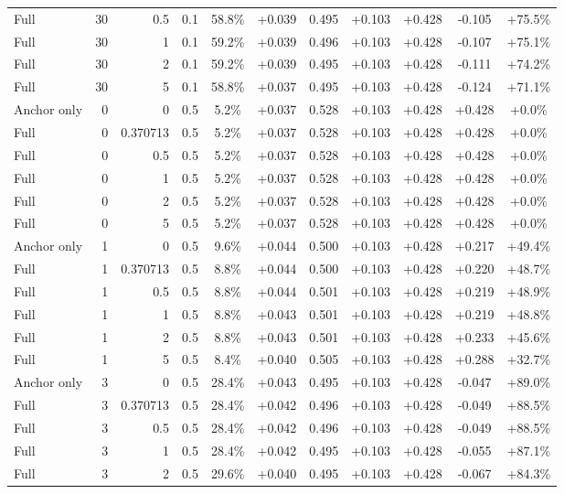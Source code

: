 \begin{table}[htbp]
\begin{tabular}{lrrrccccccc}
Full & 30 & 0.5 & 0.1 & 58.8\% & +0.039 & 0.495 & +0.103 & +0.428 & -0.105 & +75.5\% \\
Full & 30 & 1 & 0.1 & 59.2\% & +0.039 & 0.496 & +0.103 & +0.428 & -0.107 & +75.1\% \\
Full & 30 & 2 & 0.1 & 59.2\% & +0.039 & 0.495 & +0.103 & +0.428 & -0.111 & +74.2\% \\
Full & 30 & 5 & 0.1 & 58.8\% & +0.037 & 0.495 & +0.103 & +0.428 & -0.124 & +71.1\% \\
Anchor only & 0 & 0 & 0.5 & 5.2\% & +0.037 & 0.528 & +0.103 & +0.428 & +0.428 & +0.0\% \\
Full & 0 & 0.370713 & 0.5 & 5.2\% & +0.037 & 0.528 & +0.103 & +0.428 & +0.428 & +0.0\% \\
Full & 0 & 0.5 & 0.5 & 5.2\% & +0.037 & 0.528 & +0.103 & +0.428 & +0.428 & +0.0\% \\
Full & 0 & 1 & 0.5 & 5.2\% & +0.037 & 0.528 & +0.103 & +0.428 & +0.428 & +0.0\% \\
Full & 0 & 2 & 0.5 & 5.2\% & +0.037 & 0.528 & +0.103 & +0.428 & +0.428 & +0.0\% \\
Full & 0 & 5 & 0.5 & 5.2\% & +0.037 & 0.528 & +0.103 & +0.428 & +0.428 & +0.0\% \\
Anchor only & 1 & 0 & 0.5 & 9.6\% & +0.044 & 0.500 & +0.103 & +0.428 & +0.217 & +49.4\% \\
Full & 1 & 0.370713 & 0.5 & 8.8\% & +0.044 & 0.500 & +0.103 & +0.428 & +0.220 & +48.7\% \\
Full & 1 & 0.5 & 0.5 & 8.8\% & +0.044 & 0.501 & +0.103 & +0.428 & +0.219 & +48.9\% \\
Full & 1 & 1 & 0.5 & 8.8\% & +0.043 & 0.501 & +0.103 & +0.428 & +0.219 & +48.8\% \\
Full & 1 & 2 & 0.5 & 8.8\% & +0.043 & 0.501 & +0.103 & +0.428 & +0.233 & +45.6\% \\
Full & 1 & 5 & 0.5 & 8.4\% & +0.040 & 0.505 & +0.103 & +0.428 & +0.288 & +32.7\% \\
Anchor only & 3 & 0 & 0.5 & 28.4\% & +0.043 & 0.495 & +0.103 & +0.428 & -0.047 & +89.0\% \\
Full & 3 & 0.370713 & 0.5 & 28.4\% & +0.042 & 0.496 & +0.103 & +0.428 & -0.049 & +88.5\% \\
Full & 3 & 0.5 & 0.5 & 28.4\% & +0.042 & 0.496 & +0.103 & +0.428 & -0.049 & +88.5\% \\
Full & 3 & 1 & 0.5 & 28.4\% & +0.042 & 0.495 & +0.103 & +0.428 & -0.055 & +87.1\% \\
Full & 3 & 2 & 0.5 & 29.6\% & +0.040 & 0.495 & +0.103 & +0.428 & -0.067 & +84.3\% \\

\end{tabular}
\end{table}
